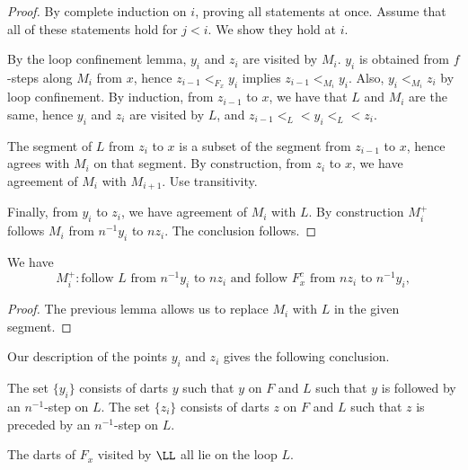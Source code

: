 \begin{proof} By complete induction on $i$, proving all statements
at once.  
Assume that all of these statements hold for $j<i$. We show they
hold at $i$.


By the loop confinement lemma, $y_i$ and $z_i$ are visited by $M_i$.
$y_i$ is obtained from $f$-steps along $M_i$ from $x$, hence
$z_{i-1} <_{F_x} y_i$ implies $z_{i-1} <_{M_i} y_i$.  Also, $y_i <_{M_i} z_i$
by loop confinement.  By induction, from $z_{i-1}$ to $x$, we have that
$L$ and $M_i$ are the same, hence $y_i$ and $z_i$ are visited by $L$, and $z_{i-1} <_L < y_i <_L < z_i$.

The segment of $L$ from $z_i$ to $x$ is a subset of the segment
from $z_{i-1}$ to $x$, hence agrees with $M_i$ on that segment.
By construction, from $z_{i}$ to $x$, we have agreement of $M_i$ with
$M_{i+1}$.  Use transitivity.

Finally, from $y_i$ to $z_i$, we have agreement of $M_i$ with $L$.
By construction $M_i^+$ follows $M_i$ from $n^{-1}y_i$ to $n z_i$.
The conclusion follows.
\end{proof}

\begin{lemma} 
We have
\[
M_i^+: \text{follow } L \text{ from } n^{-1} y_i \text{ to } n z_i
  \text{ and follow } F^c_x \text{ from } nz_i \text{ to } n^{-1} y_i,
\]
\end{lemma} 

\begin{proof} The previous lemma allows us to replace $M_i$
with $L$ in the given  segment.
\end{proof}

Our description of the points $y_i$ and $z_i$ gives the following
conclusion.

\begin{lemma} 
The set $\{y_i\}$ consists of darts $y$ such that
$y$ on $F$ and $L$ such that $y$ is followed by an 
$n^{-1}$-step on $L$.
The set $\{z_i\}$ consists of darts $z$ on $F$ and $L$ such that
$z$ is preceded by an $n^{-1}$-step on $L$.
\end{lemma} 

\begin{lemma}
The darts of $F_x$ visited by $\LL$ all lie on the loop $L$.
\end{lemma}

